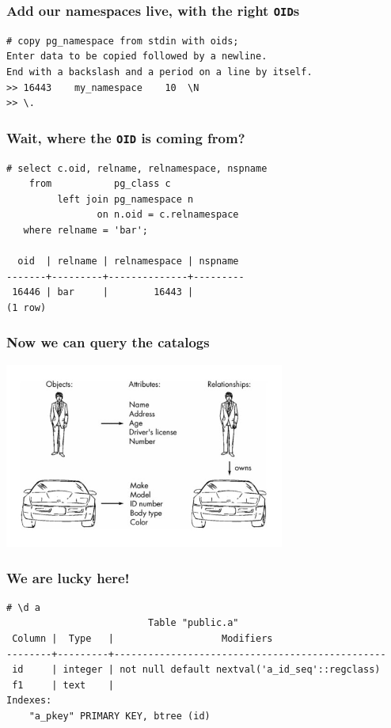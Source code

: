 \documentclass{beamer}
\begin{document}
\begin{frame}[fragile=singleslide]
  \frametitle{Add our namespaces live, with the right \texttt{OID}s}
  
  \begin{verbatim}
# copy pg_namespace from stdin with oids;
Enter data to be copied followed by a newline.
End with a backslash and a period on a line by itself.
>> 16443	my_namespace	10	\N
>> \.
  \end{verbatim}
\end{frame}

\begin{frame}[fragile]
  \frametitle{Wait, where the \texttt{OID} is coming from?}
  
  \begin{verbatim}
# select c.oid, relname, relnamespace, nspname
    from           pg_class c
         left join pg_namespace n
                on n.oid = c.relnamespace
   where relname = 'bar';

  oid  | relname | relnamespace | nspname 
-------+---------+--------------+---------
 16446 | bar     |        16443 | 
(1 row)
  \end{verbatim}
\end{frame}

\begin{frame}[fragile]
  \frametitle{Now we can query the catalogs}

  \vfill
  
  \begin{center}
    \includegraphics[height=2.4in]{relation-attributes.jpg}
  \end{center}
\end{frame}

\begin{frame}[fragile]
  \frametitle{We are lucky here!}

  \vfill

  \begin{verbatim}
# \d a
                         Table "public.a"
 Column |  Type   |                   Modifiers                    
--------+---------+------------------------------------------------
 id     | integer | not null default nextval('a_id_seq'::regclass)
 f1     | text    | 
Indexes:
    "a_pkey" PRIMARY KEY, btree (id)
  \end{verbatim}
\end{frame}
\end{document}

